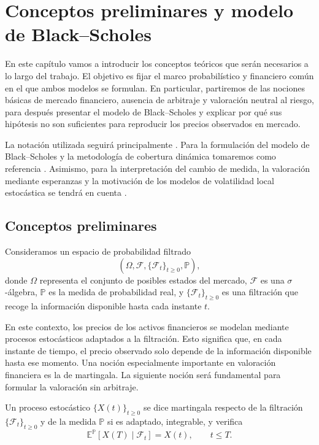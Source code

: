 \chapter[Conceptos preliminares y Black--Scholes]{Conceptos preliminares y modelo de Black--Scholes}

En este capítulo vamos a introducir los conceptos teóricos que serán necesarios a lo largo del trabajo. El objetivo es fijar el marco probabilístico y financiero común en el que ambos modelos se formulan. En particular, partiremos de las nociones básicas de mercado financiero, ausencia de arbitraje y valoración neutral al riesgo, para después presentar el modelo de Black--Scholes y explicar por qué sus hipótesis no son suficientes para reproducir los precios observados en mercado.\medskip

La notación utilizada seguirá principalmente \cite{DanielArrietaPresentation}. Para la formulación del modelo de Black--Scholes y la metodología de cobertura dinámica tomaremos como referencia \cite{CarlosVazquezMAT}. Asimismo, para la interpretación del cambio de medida, la valoración mediante esperanzas y la motivación de los modelos de volatilidad local estocástica se tendrá en cuenta \cite{oosterlee2021modelos}.\medskip

\section{Conceptos preliminares}

Consideramos un espacio de probabilidad filtrado
\[
(\Omega,\mathcal{F},\{\mathcal{F}_t\}_{t\geq 0},\mathbb{P}),
\]
donde \(\Omega\) representa el conjunto de posibles estados del mercado, \(\mathcal{F}\) es una \(\sigma\)-álgebra, \(\mathbb{P}\) es la medida de probabilidad real, y \(\{\mathcal{F}_t\}_{t\geq 0}\) es una filtración que recoge la información disponible hasta cada instante \(t\).

En este contexto, los precios de los activos financieros se modelan mediante procesos estocásticos adaptados a la filtración. Esto significa que, en cada instante de tiempo, el precio observado solo depende de la información disponible hasta ese momento. Una noción especialmente importante en valoración financiera es la de martingala. La siguiente noción será fundamental para formular la valoración sin arbitraje.

\begin{definition}
\label{def:martingala}
Un proceso estocástico \(\{X(t)\}_{t\geq 0}\) se dice martingala respecto de la filtración \(\{\mathcal{F}_t\}_{t\geq 0}\) y de la medida \(\mathbb{P}\) si es adaptado, integrable, y verifica
\[
\mathbb{E}^{\mathbb{P}}\left[X(T)\mid \mathcal{F}_t\right]=X(t),
\qquad t\leq T.
\]
\end{definition}

